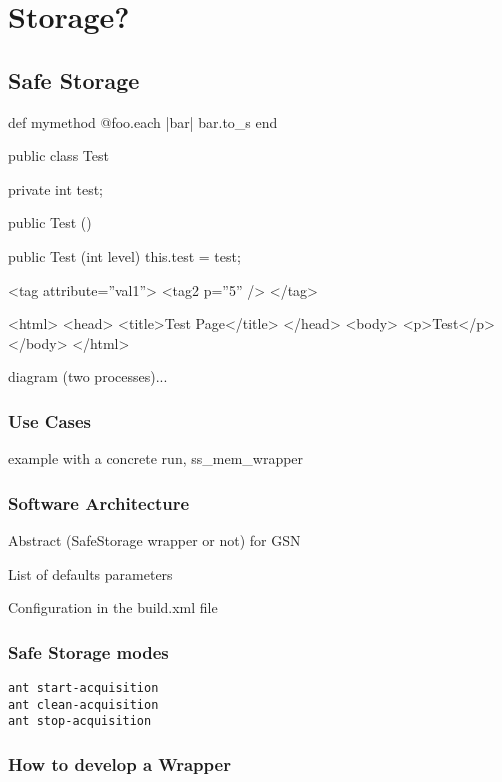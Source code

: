 \chapter{Storage?}

\section{Safe Storage}



\begin{rubycode}
def mymethod 
	@foo.each { |bar| bar.to_s }
end
\end{rubycode}

\begin{javacode}
public class Test {

	private int test;

	public Test () {}

	public Test (int level) {
		this.test = test;
	}
}
\end{javacode}

\begin{xmlcode}
<tag attribute=''val1''>
	<tag2 p=''5'' />
</tag>
\end{xmlcode}

\begin{htmlcode}
<html>
	<head>
		<title>Test Page</title>
	</head>
	<body>
		<p>Test</p>
	</body>
</html>
\end{htmlcode}



diagram (two processes)...

\subsection{Use Cases}
example with a concrete run, ss\_mem\_wrapper

\subsection{Software Architecture}

Abstract (SafeStorage wrapper or not) for GSN

List of defaults parameters

Configuration in the build.xml file

\subsection{Safe Storage modes}

\begin{verbatim}
ant start-acquisition
ant clean-acquisition
ant stop-acquisition
\end{verbatim}

\subsection{How to develop a Wrapper}
